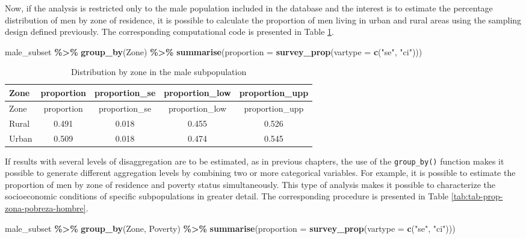 \documentclass[
  english,
  12pt,
]{book}
\newenvironment{Shaded}{\begin{snugshade}}{\end{snugshade}}
\newcommand{\AttributeTok}[1]{\textcolor[rgb]{0.13,0.29,0.53}{#1}}
\newcommand{\FunctionTok}[1]{\textcolor[rgb]{0.13,0.29,0.53}{\textbf{#1}}}
\newcommand{\NormalTok}[1]{#1}
\newcommand{\SpecialCharTok}[1]{\textcolor[rgb]{0.81,0.36,0.00}{\textbf{#1}}}
\newcommand{\StringTok}[1]{\textcolor[rgb]{0.31,0.60,0.02}{#1}}
\begin{document}
Now, if the analysis is restricted only to the male population included in the database and the interest is to estimate the percentage distribution of men by zone of residence, it is possible to calculate the proportion of men living in urban and rural areas using the sampling design defined previously. The corresponding computational code is presented in Table \ref{tab:tab-prop-zona-hombre}.

\begin{Shaded}
\begin{Highlighting}[]
\NormalTok{male\_subset }\SpecialCharTok{\%\textgreater{}\%}
  \FunctionTok{group\_by}\NormalTok{(Zone) }\SpecialCharTok{\%\textgreater{}\%}
  \FunctionTok{summarise}\NormalTok{(}\AttributeTok{proportion =} \FunctionTok{survey\_prop}\NormalTok{(}\AttributeTok{vartype =} \FunctionTok{c}\NormalTok{(}\StringTok{"se"}\NormalTok{, }\StringTok{"ci"}\NormalTok{)))}
\end{Highlighting}
\end{Shaded}

\begin{longtable}[]{@{}lcccc@{}}
\caption{\label{tab:tab-prop-zona-hombre}Distribution by zone in the male subpopulation}\tabularnewline
\toprule\noalign{}
Zone & proportion & proportion\_se & proportion\_low & proportion\_upp \\
\midrule\noalign{}
\endfirsthead
\toprule\noalign{}
Zone & proportion & proportion\_se & proportion\_low & proportion\_upp \\
\midrule\noalign{}
\endhead
\bottomrule\noalign{}
\endlastfoot
Rural & 0.491 & 0.018 & 0.455 & 0.526 \\
Urban & 0.509 & 0.018 & 0.474 & 0.545 \\
\end{longtable}

If results with several levels of disaggregation are to be estimated, as in previous chapters, the use of the \texttt{group\_by()} function makes it possible to generate different aggregation levels by combining two or more categorical variables. For example, it is possible to estimate the proportion of men by zone of residence and poverty status simultaneously. This type of analysis makes it possible to characterize the socioeconomic conditions of specific subpopulations in greater detail. The corresponding procedure is presented in Table \ref{tab:tab-prop-zona-pobreza-hombre}.

\begin{Shaded}
\begin{Highlighting}[]
\NormalTok{male\_subset }\SpecialCharTok{\%\textgreater{}\%}
  \FunctionTok{group\_by}\NormalTok{(Zone, Poverty) }\SpecialCharTok{\%\textgreater{}\%}
  \FunctionTok{summarise}\NormalTok{(}\AttributeTok{proportion =} \FunctionTok{survey\_prop}\NormalTok{(}\AttributeTok{vartype =} \FunctionTok{c}\NormalTok{(}\StringTok{"se"}\NormalTok{, }\StringTok{"ci"}\NormalTok{)))}
\end{Highlighting}
\end{Shaded}
\end{document}

